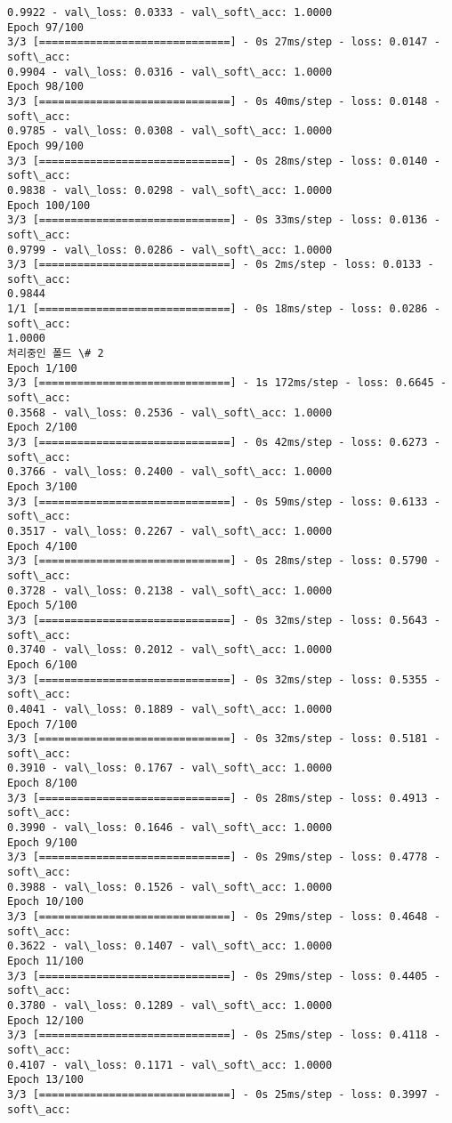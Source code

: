 \documentclass[11pt]{article}
\begin{document}
\begin{Verbatim}[commandchars=\\\{\}]
0.9922 - val\_loss: 0.0333 - val\_soft\_acc: 1.0000
Epoch 97/100
3/3 [==============================] - 0s 27ms/step - loss: 0.0147 - soft\_acc:
0.9904 - val\_loss: 0.0316 - val\_soft\_acc: 1.0000
Epoch 98/100
3/3 [==============================] - 0s 40ms/step - loss: 0.0148 - soft\_acc:
0.9785 - val\_loss: 0.0308 - val\_soft\_acc: 1.0000
Epoch 99/100
3/3 [==============================] - 0s 28ms/step - loss: 0.0140 - soft\_acc:
0.9838 - val\_loss: 0.0298 - val\_soft\_acc: 1.0000
Epoch 100/100
3/3 [==============================] - 0s 33ms/step - loss: 0.0136 - soft\_acc:
0.9799 - val\_loss: 0.0286 - val\_soft\_acc: 1.0000
3/3 [==============================] - 0s 2ms/step - loss: 0.0133 - soft\_acc:
0.9844
1/1 [==============================] - 0s 18ms/step - loss: 0.0286 - soft\_acc:
1.0000
처리중인 폴드 \# 2
Epoch 1/100
3/3 [==============================] - 1s 172ms/step - loss: 0.6645 - soft\_acc:
0.3568 - val\_loss: 0.2536 - val\_soft\_acc: 1.0000
Epoch 2/100
3/3 [==============================] - 0s 42ms/step - loss: 0.6273 - soft\_acc:
0.3766 - val\_loss: 0.2400 - val\_soft\_acc: 1.0000
Epoch 3/100
3/3 [==============================] - 0s 59ms/step - loss: 0.6133 - soft\_acc:
0.3517 - val\_loss: 0.2267 - val\_soft\_acc: 1.0000
Epoch 4/100
3/3 [==============================] - 0s 28ms/step - loss: 0.5790 - soft\_acc:
0.3728 - val\_loss: 0.2138 - val\_soft\_acc: 1.0000
Epoch 5/100
3/3 [==============================] - 0s 32ms/step - loss: 0.5643 - soft\_acc:
0.3740 - val\_loss: 0.2012 - val\_soft\_acc: 1.0000
Epoch 6/100
3/3 [==============================] - 0s 32ms/step - loss: 0.5355 - soft\_acc:
0.4041 - val\_loss: 0.1889 - val\_soft\_acc: 1.0000
Epoch 7/100
3/3 [==============================] - 0s 32ms/step - loss: 0.5181 - soft\_acc:
0.3910 - val\_loss: 0.1767 - val\_soft\_acc: 1.0000
Epoch 8/100
3/3 [==============================] - 0s 28ms/step - loss: 0.4913 - soft\_acc:
0.3990 - val\_loss: 0.1646 - val\_soft\_acc: 1.0000
Epoch 9/100
3/3 [==============================] - 0s 29ms/step - loss: 0.4778 - soft\_acc:
0.3988 - val\_loss: 0.1526 - val\_soft\_acc: 1.0000
Epoch 10/100
3/3 [==============================] - 0s 29ms/step - loss: 0.4648 - soft\_acc:
0.3622 - val\_loss: 0.1407 - val\_soft\_acc: 1.0000
Epoch 11/100
3/3 [==============================] - 0s 29ms/step - loss: 0.4405 - soft\_acc:
0.3780 - val\_loss: 0.1289 - val\_soft\_acc: 1.0000
Epoch 12/100
3/3 [==============================] - 0s 25ms/step - loss: 0.4118 - soft\_acc:
0.4107 - val\_loss: 0.1171 - val\_soft\_acc: 1.0000
Epoch 13/100
3/3 [==============================] - 0s 25ms/step - loss: 0.3997 - soft\_acc:

\end{Verbatim}
\end{document}
